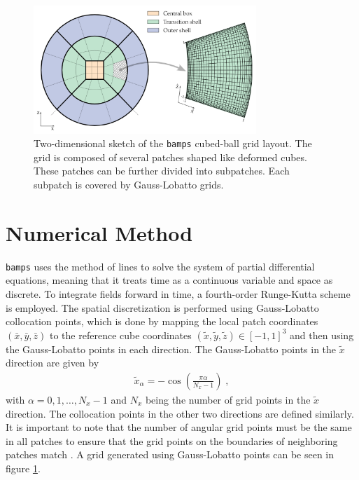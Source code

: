 \begin{figure}[t!]
    \centering
    \includegraphics[width=0.75\textwidth]{Figures/Cubed_Ball.png}
    \caption{Two-dimensional sketch of the \texttt{bamps} cubed-ball grid layout. The grid is composed of several patches shaped like deformed cubes. These patches can be further divided into subpatches. Each subpatch is covered by Gauss-Lobatto grids. \cite{Pseudospectral_method_for_gravitational_wave_collapse}}
    \label{fig:cubed_ball_grid}
\end{figure}

\section{Numerical Method}
\label{section:Numerical_Method}

\texttt{bamps} uses the method of lines to solve the system of partial differential equations, meaning that it treats time as a continuous variable and space as discrete. To integrate fields forward in time, a fourth-order Runge-Kutta scheme is employed. The spatial discretization is performed using Gauss-Lobatto collocation points, which is done by mapping the local patch coordinates $(\bar{x},\bar{y},\bar{z})$ to the reference cube coordinates $(\tilde{x},\tilde{y},\tilde{z}) \in [-1,1]^3$ and then using the Gauss-Lobatto points in each direction. The Gauss-Lobatto points in the $\tilde{x}$ direction are given by
%
\begin{align}
    \tilde{x}_\alpha = - \cos\left(\frac{\pi \alpha}{N_x -1}\right) \; ,
\end{align}
%
with $\alpha = 0,1,\ldots,N_x -1$ and $N_x$ being the number of grid points in the $\tilde{x}$ direction. The collocation points in the other two directions are defined similarly. It is important to note that the number of angular grid points must be the same in all patches to ensure that the grid points on the boundaries of neighboring patches match \cite{Pseudospectral_method_for_gravitational_wave_collapse}. A grid generated using Gauss-Lobatto points can be seen in figure \ref{fig:cubed_ball_grid}.

